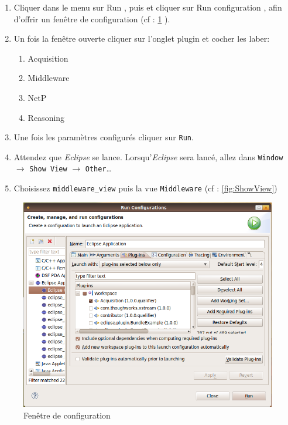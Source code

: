 \begin{enumerate}
 \item Cliquer dans le menu sur \og Run \fg, puis et cliquer sur \og Run configuration \fg, 
afin d'offrir un fenêtre de configuration (cf : \ref{fig:fenetreConfg} ).
  \item Un fois la fenêtre ouverte cliquer sur l'onglet plugin et cocher les laber:
  \begin{enumerate}
      \item Acquisition
      \item Middleware
      \item NetP
      \item Reasoning
      \end{enumerate}
      \item Une fois les paramètres configurés cliquer sur \verb+Run+.
      \item Attendez que \emph{Eclipse} se lance. Lorsqu'\emph{Eclipse} sera lancé, allez dans \verb+Window+ $\rightarrow$ \verb+Show View+ $\rightarrow$ \verb+Other+\dots
      \item Choisissez \verb+middleware_view+ puis la vue \verb+Middleware+ (cf : \ref{fig:ShowView})
\end{enumerate}
  \begin{figure}[h]
	  \centering
	  \includegraphics[scale=0.40]{img/tuto}
	  \caption{Fenêtre de configuration}
	  \label{fig:fenetreConfg}
\end{figure}
